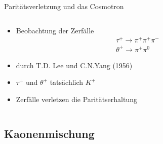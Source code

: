 \documentclass[aspectratio=1610, professionalfonts, 9pt, t]{beamer}
\begin{document}
\begin{frame}{Paritätsverletzung und das Cosmotron}
\begin{columns}[onlytextwidth]
\begin{column}{0.5\textwidth}
\begin{itemize}
          \item Beobachtung der Zerfälle
          \begin{align*}
            \tau^{+} \rightarrow \pi^{+} \pi^{+} \pi^{-} \\
            \theta^{+} \rightarrow \pi^{+} \pi^{0}
          \end{align*}
          \item[] durch T.D. Lee und C.N.Yang (1956)
          \item $\tau^{+}$ und $\theta^{+}$ tatsächlich $K^{+}$
          \item[\rightarrow] Zerfälle verletzen die Paritätserhaltung
        \end{itemize}
      \end{column}
    \end{columns}
  \end{frame}

\subsection{Kaonenmischung}
\end{document}
